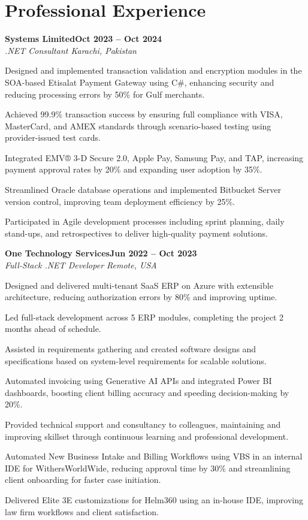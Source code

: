 \documentclass[letterpaper,10pt]{article}
\newcommand{\headingBf}[2]{
  \hspace{10pt}\textbf{#1}\hfill\textbf{#2}\\
}
\newcommand{\headingIt}[2]{
  \hspace{10pt}\textit{#1}\hfill\textit{#2}\\
}
\newenvironment{resume_list}{
  \vspace{-7pt}
  \begin{itemize}[itemsep=-2px, parsep=1pt, leftmargin=30pt]
}{
  \end{itemize}
}
\begin{document}
\section{Professional Experience}

\headingBf{Systems Limited}{Oct 2023 -- Oct 2024}
\headingIt{.NET Consultant \hfill Karachi, Pakistan}{}
\begin{resume_list}
    \item Designed and implemented transaction validation and encryption modules in the SOA-based Etisalat Payment Gateway using C\#, enhancing security and reducing processing errors by 50\% for Gulf merchants.
    \item Achieved 99.9\% transaction success by ensuring full compliance with VISA, MasterCard, and AMEX standards through scenario-based testing using provider-issued test cards.
    \item Integrated EMV® 3-D Secure 2.0, Apple Pay, Samsung Pay, and TAP, increasing payment approval rates by 20\% and expanding user adoption by 35\%.
    \item Streamlined Oracle database operations and implemented Bitbucket Server version control, improving team deployment efficiency by 25\%.
    \item Participated in Agile development processes including sprint planning, daily stand-ups, and retrospectives to deliver high-quality payment solutions.
\end{resume_list}

\headingBf{One Technology Services}{Jun 2022 -- Oct 2023}
\headingIt{Full-Stack .NET Developer \hfill Remote, USA}{}
\begin{resume_list}
    \item Designed and delivered multi-tenant SaaS ERP on Azure with extensible architecture, reducing authorization errors by 80\% and improving uptime.
    \item Led full-stack development across 5 ERP modules, completing the project 2 months ahead of schedule.
    \item Assisted in requirements gathering and created software designs and specifications based on system-level requirements for scalable solutions.
    \item Automated invoicing using Generative AI APIs and integrated Power BI dashboards, boosting client billing accuracy and speeding decision-making by 20\%.
    \item Provided technical support and consultancy to colleagues, maintaining and improving skillset through continuous learning and professional development.
    \item Automated New Business Intake and Billing Workflows using VBS in an internal IDE for WithersWorldWide, reducing approval time by 30\% and streamlining client onboarding for faster case initiation.
    \item Delivered Elite 3E customizations for Helm360 using an in-house IDE, improving law firm workflows and client satisfaction.
\end{resume_list}
\end{document}

